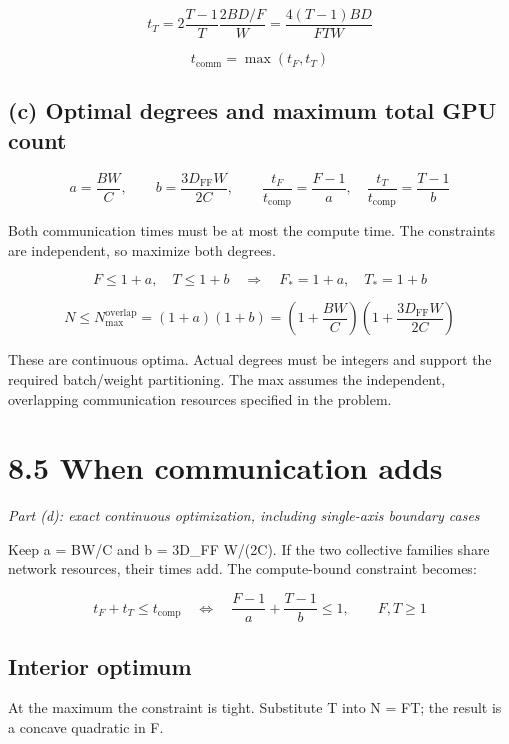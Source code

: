 \documentclass[10pt,a4paper]{article}
\begin{document}
\[t_T=2\frac{T-1}{T}\frac{2BD/F}{W}=\frac{4(T-1)BD}{FTW}\]

\[\boxed{t_{\mathrm{comm}}=\max(t_F,t_T)}\]

\subsection*{(c) Optimal degrees and maximum total GPU count}

\[a=\frac{BW}{C},\qquad b=\frac{3D_{\mathrm{FF}}W}{2C},\qquad \frac{t_F}{t_{\mathrm{comp}}}=\frac{F-1}{a},\quad\frac{t_T}{t_{\mathrm{comp}}}=\frac{T-1}{b}\]

Both communication times must be at most the compute time. The constraints are independent, so maximize both degrees.\par

\[F\leq 1+a,\quad T\leq 1+b\quad\Longrightarrow\quad F_*=1+a,\quad T_*=1+b\]

\[\boxed{N\leq N_{\max}^{\mathrm{overlap}}=(1+a)(1+b)=\left(1+\frac{BW}{C}\right)\left(1+\frac{3D_{\mathrm{FF}}W}{2C}\right)}\]

{\small These are continuous optima. Actual degrees must be integers and support the required batch/weight partitioning. The max assumes the independent, overlapping communication resources specified in the problem.}\par

\clearpage

\section*{8.5 \textperiodcentered{} When communication adds}

\textit{Part (d): exact continuous optimization, including single-axis boundary cases}\par

Keep a = BW/C and b = 3D\_FF W/(2C). If the two collective families share network resources, their times add. The compute-bound constraint becomes:\par

\[\boxed{t_F+t_T\leq t_{\mathrm{comp}}\quad\Longleftrightarrow\quad\frac{F-1}{a}+\frac{T-1}{b}\leq 1,\qquad F,T\geq 1}\]

\subsection*{Interior optimum}

At the maximum the constraint is tight. Substitute T into N = FT; the result is a concave quadratic in F.\par
\end{document}
